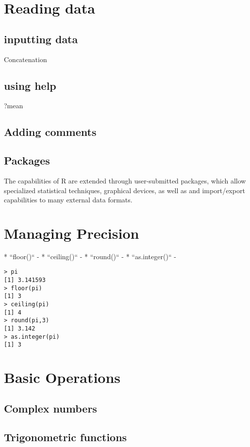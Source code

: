 \section{Reading data}


\subsection{inputting data}
Concatenation

\subsection{using help}

?mean

\subsection{Adding comments}

\subsection{Packages}
The capabilities of R are extended through user-submitted packages, which allow specialized statistical techniques, graphical devices, as well as and
import/export capabilities to many external data formats.

\section{Managing Precision}
\begin{itemize}
*  ``floor()`` - 
*  ``ceiling()`` - 
*  ``round()`` - 
*  ``as.integer()`` -
\end{itemize}

\begin{framed}
\begin{verbatim}
> pi
[1] 3.141593
> floor(pi)
[1] 3
> ceiling(pi)
[1] 4
> round(pi,3)
[1] 3.142
> as.integer(pi)
[1] 3
\end{verbatim}
\end{framed}

\section{Basic Operations}
\subsection{Complex numbers}
\subsection{Trigonometric functions}
